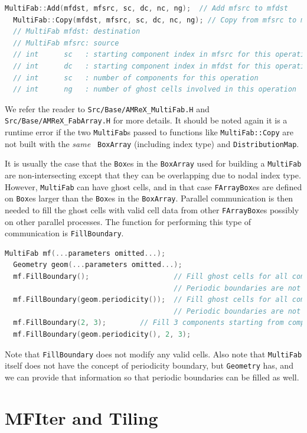{{{\begin{lstlisting}[language=cpp]
  MultiFab::Add(mfdst, mfsrc, sc, dc, nc, ng);  // Add mfsrc to mfdst
  MultiFab::Copy(mfdst, mfsrc, sc, dc, nc, ng); // Copy from mfsrc to mfdst
  // MultiFab mfdst: destination 
  // MultiFab mfsrc: source
  // int      sc   : starting component index in mfsrc for this operation
  // int      dc   : starting component index in mfdst for this operation
  // int      sc   : number of components for this operation
  // int      ng   : number of ghost cells involved in this operation
\end{lstlisting}
We refer the reader to {\tt Src/Base/AMReX\_MultiFab.H} and {\tt
  Src/Base/AMReX\_FabArray.H} for more details.  It should be noted
again it is a runtime error if the two {\tt MultiFab}s passed to functions
like {\tt MultiFab::Copy} are not built with the {\emph{same}} {\tt
  BoxArray} (including index type) and {\tt DistributionMap}. 

It is usually the case that the {\tt Box}es in the {\tt BoxArray} used
for building a {\tt MultiFab} are non-intersecting except that they
can be overlapping due to nodal index type.  However, {\tt MultiFab}
can have ghost cells, and in that case {\tt FArrayBox}es are defined
on {\tt Box}es larger than the {\tt Box}es in the {\tt BoxArray}.
Parallel communication is then needed to fill the ghost cells with
valid cell data from other {\tt FArrayBox}es possibly on other
parallel processes.  The function for performing this type of
communication is {\tt FillBoundary}.
\begin{lstlisting}[language=cpp]
  MultiFab mf(...parameters omitted...);
  Geometry geom(...parameters omitted...);
  mf.FillBoundary();                    // Fill ghost cells for all components
                                        // Periodic boundaries are not filled.
  mf.FillBoundary(geom.periodicity());  // Fill ghost cells for all components
                                        // Periodic boundaries are not filled.
  mf.FillBoundary(2, 3);        // Fill 3 components starting from component 2
  mf.FillBoundary(geom.periodicity(), 2, 3);
\end{lstlisting}
Note that {\tt FillBoundary} does not modify any valid cells.  Also
note that {\tt MultiFab} itself does not have the concept of
periodicity boundary, but {\tt Geometry} has, and we can provide that
information so that periodic boundaries can be filled as well.


\section{MFIter and Tiling}
\label{sec:basics:mfiter}

}}}
